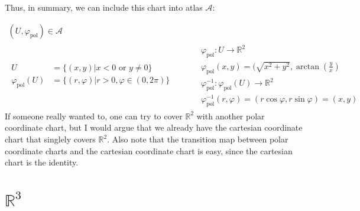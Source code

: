 \documentclass[10pt, twoside]{amsart}
\begin{document}
\begin{multicols*}{2}
Thus, in summary, we can include this chart into atlas $\mathcal{A}$:

\begin{equation} \label{Eq:UR2}
\begin{gathered}
  (U, \varphi_{\text{pol}}) \in \mathcal{A} \\ 
  \begin{aligned}
    U & = \lbrace (x,y) | x<0 \text{ or } y \neq 0 \rbrace  \\
    \varphi_{\text{pol}}(U) & = \lbrace (r,\varphi) | r >0, \varphi \in (0,2\pi) \rbrace
\end{aligned} \quad \quad \, \begin{aligned}
    & \varphi_{\text{pol}}:U \to \mathbb{R}^2 \\ 
    & \varphi_{\text{pol}}(x,y) = ( \sqrt{x^2 + y^2}, \arctan{ \left( \frac{y}{x} \right) } \\ 
    & \varphi^{-1}_{\text{pol}}: \varphi_{\text{pol}}(U) \to \mathbb{R}^2 \\ 
    & \varphi^{-1}_{\text{pol}}(r,\varphi) = (r\cos{\varphi}, r\sin{\varphi}) = (x,y)
\end{aligned}
\end{gathered}
\end{equation}
If someone really wanted to, one can try to cover $\mathbb{R}^2$ with another polar coordinate chart, but I would argue that we already have the cartesian coordinate chart that singlely covers $\mathbb{R}^2$. Also note that the transition map between polar coordinate charts and the cartesian coordinate chart is easy, since the cartesian chart is the identity.  

\section{$\mathbb{R}^3$}


\end{multicols*}
\end{document}
